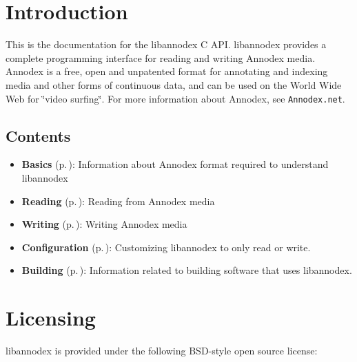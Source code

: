 \section{Introduction}\label{intro}
This is the documentation for the libannodex C API. libannodex provides a complete programming interface for reading and writing Annodex media. Annodex is a free, open and unpatented format for annotating and indexing media and other forms of continuous data, and can be used on the World Wide Web for \char`\"{}video surfing\char`\"{}. For more information about Annodex, see {\tt Annodex.net}.\subsection{Contents}\label{Contents}
\begin{itemize}
\item {\bf Basics }{\rm (p.\,\pageref{group__basics})}: Information about Annodex format required to understand libannodex\end{itemize}


\begin{itemize}
\item {\bf Reading }{\rm (p.\,\pageref{group__reading})}: Reading from Annodex media\end{itemize}


\begin{itemize}
\item {\bf Writing }{\rm (p.\,\pageref{group__writing})}: Writing Annodex media\end{itemize}


\begin{itemize}
\item {\bf Configuration }{\rm (p.\,\pageref{group__configuration})}: Customizing libannodex to only read or write.\end{itemize}


\begin{itemize}
\item {\bf Building }{\rm (p.\,\pageref{group__building})}: Information related to building software that uses libannodex.\end{itemize}
\section{Licensing}\label{Licensing}
libannodex is provided under the following BSD-style open source license:



